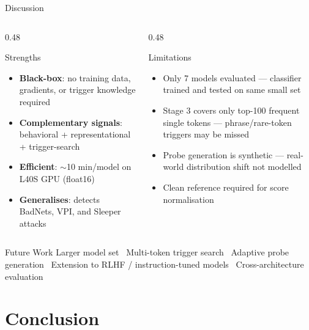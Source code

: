 \documentclass[aspectratio=169]{beamer}
\begin{document}
\begin{frame}{Discussion}
\begin{columns}
\begin{column}{0.48\textwidth}
  \begin{block}{Strengths}
    \begin{itemize}
      \item \textbf{Black-box}: no training data, gradients, or trigger knowledge required
      \item \textbf{Complementary signals}: behavioral + representational + trigger-search
      \item \textbf{Efficient}: $\sim$10 min/model on L40S GPU (float16)
      \item \textbf{Generalises}: detects BadNets, VPI, and Sleeper attacks
    \end{itemize}
  \end{block}
\end{column}
\begin{column}{0.48\textwidth}
  \begin{block}{Limitations}
    \begin{itemize}
      \item Only 7 models evaluated --- classifier trained and tested on same small set
      \item Stage 3 covers only top-100 frequent single tokens --- phrase/rare-token triggers may be missed
      \item Probe generation is synthetic --- real-world distribution shift not modelled
      \item Clean reference required for score normalisation
    \end{itemize}
  \end{block}
\end{column}
\end{columns}
\vspace{0.5em}
\begin{block}{Future Work}
  Larger model set \textbullet\ Multi-token trigger search \textbullet\ Adaptive probe generation \textbullet\ Extension to RLHF / instruction-tuned models \textbullet\ Cross-architecture evaluation
\end{block}
\end{frame}

\section{Conclusion}
\end{document}
